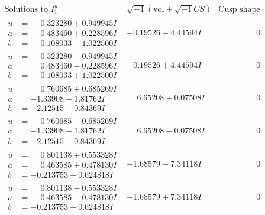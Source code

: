\documentclass[1p]{elsarticle_modified}
\theoremstyle{definition}
\newcommand{\I}{\sqrt{-1}}
\begin{document}
$$\begin{array}{c|c|c}  
\text{Solutions to }I^u_{1}& \I (\text{vol} + \sqrt{-1}CS) & \text{Cusp shape}\\
 \hline 
\begin{aligned}
u &= \phantom{-}0.323280 + 0.949945 I \\
a &= \phantom{-}0.483460 + 0.228596 I \\
b &= \phantom{-}0.108033 - 1.022500 I\end{aligned}
 & -0.19526 - 4.44594 I & \phantom{-0.000000 } 0 \\ \hline\begin{aligned}
u &= \phantom{-}0.323280 - 0.949945 I \\
a &= \phantom{-}0.483460 - 0.228596 I \\
b &= \phantom{-}0.108033 + 1.022500 I\end{aligned}
 & -0.19526 + 4.44594 I & \phantom{-0.000000 } 0 \\ \hline\begin{aligned}
u &= \phantom{-}0.760685 + 0.685269 I \\
a &= -1.33908 - 1.81762 I \\
b &= -2.12515 - 0.84369 I\end{aligned}
 & \phantom{-}6.65208 + 0.07508 I & \phantom{-0.000000 } 0 \\ \hline\begin{aligned}
u &= \phantom{-}0.760685 - 0.685269 I \\
a &= -1.33908 + 1.81762 I \\
b &= -2.12515 + 0.84369 I\end{aligned}
 & \phantom{-}6.65208 - 0.07508 I & \phantom{-0.000000 } 0 \\ \hline\begin{aligned}
u &= \phantom{-}0.801138 + 0.553328 I \\
a &= \phantom{-}0.463585 + 0.478130 I \\
b &= -0.213753 - 0.624818 I\end{aligned}
 & -1.68579 - 7.34118 I & \phantom{-0.000000 } 0 \\ \hline\begin{aligned}
u &= \phantom{-}0.801138 - 0.553328 I \\
a &= \phantom{-}0.463585 - 0.478130 I \\
b &= -0.213753 + 0.624818 I\end{aligned}
 & -1.68579 + 7.34118 I & \phantom{-0.000000 } 0 \\ \hline\begin{aligned}

\end{aligned}
\end{array}$$
\end{document}

